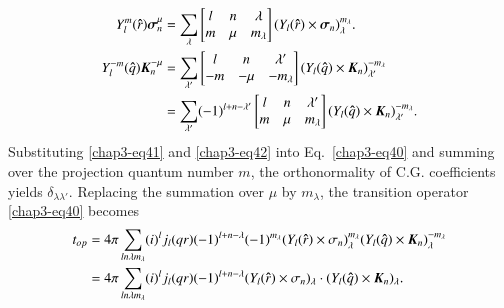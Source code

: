 \begin{align}
  Y_l^m ({\boldsymbol \hat{r}}) {\boldsymbol \sigma}_n^\mu & = \sum_{\lambda}
  \begin{bmatrix} l & n & \lambda\\ m & \mu & m_\lambda \end{bmatrix} (Y_l ({\boldsymbol \hat{r}}) \times {\boldsymbol \sigma_n})_\lambda^{m_\lambda}. \label{chap3-eq41}\\
  Y_l^{-m} ({\boldsymbol \hat{q}}) {\boldsymbol K}_n^{-\mu} & = \sum_{\lambda'}
  \begin{bmatrix}    l & n & \lambda' \\ -m & -\mu & -m_\lambda  \end{bmatrix}
  (Y_l ({\boldsymbol \hat{q}}) \times {\boldsymbol K}_n)_{\lambda'}^{-m_\lambda} \notag \\
  & = \sum_{\lambda '} (-1)^{l + n - \lambda'}
  \begin{bmatrix}    l & n & \lambda'\\ m & \mu & m_\lambda  \end{bmatrix}
  (Y_l ({\boldsymbol \hat{q}}) \times {\boldsymbol K}_n)_{\lambda'}^{-m_\lambda}. \label{chap3-eq42}
\end{align}
Substituting \eqref{chap3-eq41} and \eqref{chap3-eq42} into Eq.\ \eqref{chap3-eq40} and summing over the projection quantum number $m$, the orthonormality of C.G. coefficients yields $\delta_{\lambda \lambda'}$. Replacing the summation over $\mu$ by $m_{\lambda}$, the transition operator \eqref{chap3-eq40} becomes
\begin{align}
  t_{op} & = 4 \pi \sum_{ln \lambda m_\lambda} (i)^l j_l (qr) (-1)^{l + n - \lambda} (-1)^{m_\lambda} (Y_l({\boldsymbol \hat{r}}) \times \sigma_n)_\lambda^{m_\lambda} (Y_l ({\boldsymbol \hat{q}}) \times {\boldsymbol K}_n)_\lambda^{-m_\lambda} \notag \\
  & = 4 \pi \sum_{ln \lambda m_\lambda} (i)^l j_l (qr) (-1)^{l+n-\lambda} (Y_l ({\boldsymbol \hat{r}}) \times \sigma_{n})_\lambda \cdot (Y_l ({\boldsymbol \hat{q}}) \times {\boldsymbol K}_n)_\lambda. \label{chap3-eq43}
\end{align}

